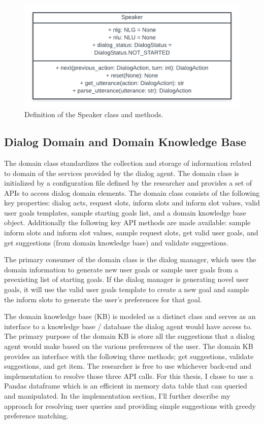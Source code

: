 \begin{figure}[h!]
	\includegraphics[width=\linewidth]{diagrams/speaker_class.png}
	\caption{ Definition of the Speaker class and methods.}
	\label{fig:speaker_class}
\end{figure}


\subsection{Dialog Domain and Domain Knowledge Base}

The domain class standardizes the collection and storage of information related to domain of the services provided by the dialog agent. The domain class is initialized by a configuration file defined by the researcher and provides a set of APIs to access dialog domain elements. The domain class consists of the following key properties: dialog acts, request slots, inform slots and inform slot values, valid user goals templates, sample starting goals list, and a domain knowledge base object.  Additionally the following key API methods are made available: sample inform slots and inform slot values, sample request slots, get valid user goals, and get suggestions (from domain knowledge base) and validate suggestions. 

The primary consumer of the domain class is the dialog manager, which uses the domain information to generate new user goals or sample user goals from a preexisting list of starting goals. If the dialog manager is generating novel user goals, it will use the valid user goals template to create a new goal and sample the inform slots to generate the user's preferences for that goal. 

The domain knowledge base (KB) is modeled as a distinct class and serves as an interface to a knowledge base / database the dialog agent would have access to. The primary purpose of the domain KB is store all the suggestions that a dialog agent would make based on the various preferences of the user. The domain KB provides an interface with the following three methods; get suggestions, validate suggestions, and get item. The researcher is free to use whichever back-end and implementation to resolve those three API calls. For this thesis, I chose to use a Pandas dataframe which is an efficient in memory data table that can queried and manipulated. In the implementation section, I'll further describe my approach for resolving user queries and providing simple suggestions with greedy preference matching. 

